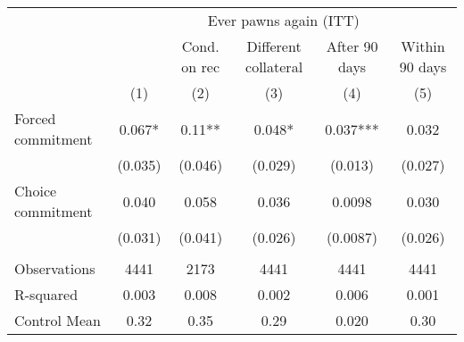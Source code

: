 \begin{tabular}{lccccc}
\toprule
      & \multicolumn{5}{c}{Ever pawns again (ITT)} \\
\cmidrule{2-6}      &       & Cond. on rec & Different collateral & After 90 days & Within 90 days \\
\midrule
\midrule
      & (1)   & (2)   & (3)   & (4)   & (5) \\
\midrule
\midrule
Forced commitment & 0.067* & 0.11** & 0.048* & 0.037*** & 0.032 \\
      & (0.035) & (0.046) & (0.029) & (0.013) & (0.027) \\
Choice commitment & 0.040 & 0.058 & 0.036 & 0.0098 & 0.030 \\
      & (0.031) & (0.041) & (0.026) & (0.0087) & (0.026) \\
      &       &       &       &       &  \\
\midrule
Observations & 4441  & 2173  & 4441  & 4441  & 4441 \\
R-squared & 0.003 & 0.008 & 0.002 & 0.006 & 0.001 \\
Control Mean & 0.32  & 0.35  & 0.29  & 0.020 & 0.30 \\
\bottomrule
\bottomrule
\end{tabular}%
